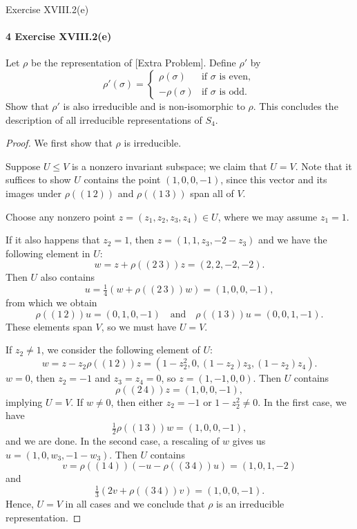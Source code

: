 \documentclass[12pt]{article}
\newlength{\myparskip}
\newenvironment{fullbox}{\begin{lrbox}{\savefullbox}\begin{minipage}{\dimexpr\textwidth-2\fboxsep\relax}\setlength{\parskip}{\myparskip}}{\end{minipage}\end{lrbox}\framebox[\textwidth]{\usebox{\savefullbox}}}
\newenvironment{pbox}[1][]{\begin{fullbox}\ifx#1\empty\else\paragraph{#1}\fi}{\end{fullbox}}
\newcommand{\isp}[1]{\quad\text{#1}\quad}
\newcommand{\<}{\langle}
\renewcommand{\>}{\rangle}
\theoremstyle{definition}
\begin{document}
\newpage
\begin{pbox}[4 Exercise XVIII.2(e)]
    Let $\rho$ be the representation of [Extra Problem]. Define $\rho'$ by
    \[
        \rho'(\sigma) = \begin{cases}
            \rho(\sigma) & \text{if $\sigma$ is even}, \\
            -\rho(\sigma) & \text{if $\sigma$ is odd}.
        \end{cases}
    \]
    Show that $\rho'$ is also irreducible and is non-isomorphic to $\rho$. This concludes the description of all irreducible representations of $S_4$.
\end{pbox}

\begin{proof}
    We first show that $\rho$ is irreducible.
    
    Suppose $U \leq V$ is a nonzero invariant subspace; we claim that $U = V$.
    Note that it suffices to show $U$ contains the point $(1, 0, 0, -1)$, since this vector and its images under $\rho((1 \, 2))$ and $\rho((1 \, 3))$ span all of $V$.

    Choose any nonzero point $z = (z_1, z_2, z_3, z_4) \in U$, where we may assume $z_1 = 1$.
    
    If it also happens that $z_2 = 1$, then $z = (1, 1, z_3, -2 - z_3)$ and we have the following element in $U$:
    \[
        w = z + \rho((2 \, 3))z = (2, 2, -2, -2).
    \]
    Then $U$ also contains
    \[
        u = \tfrac{1}{4}(w + \rho((2 \, 3))w) = (1, 0, 0, -1),
    \]
    from which we obtain
    \[
        \rho((1 \, 2))u = (0, 1, 0, -1) \isp{and} \rho((1 \, 3))u = (0, 0, 1, -1).
    \]
    These elements span $V$, so we must have $U = V$.
    
    If $z_2 \ne 1$, we consider the following element of $U$:
    \[
        w = z - z_2\rho((1 \, 2))z = (1 - z_2^2, 0, (1 - z_2)z_3, (1 - z_2)z_4).
    \]
    $w = 0$, then $z_2 = -1$ and $z_3 = z_4 = 0$, so $z = (1, -1, 0, 0)$. Then $U$ contains
    \[
        \rho((2 \, 4))z = (1, 0, 0, -1),
    \]
    implying $U = V$. If $w \ne 0$, then either $z_2 = -1$ or $1 - z_2^2 \ne 0$. In the first case, we have
    \[
        \tfrac{1}{2}\rho((1 \, 3))w = (1, 0, 0, -1),
    \]
    and we are done. In the second case, a rescaling of $w$ gives us $u = (1, 0, w_3, -1 - w_3)$. Then $U$ contains
    \[
        v = \rho((1 \, 4))(-u - \rho((3 \, 4))u) = (1, 0, 1, -2)
    \]
    and
    \[
        \tfrac{1}{3}(2v + \rho((3 \, 4))v) = (1, 0, 0, -1).
    \]
    Hence, $U = V$ in all cases and we conclude that $\rho$ is an irreducible representation.


\end{proof}
\end{document}
